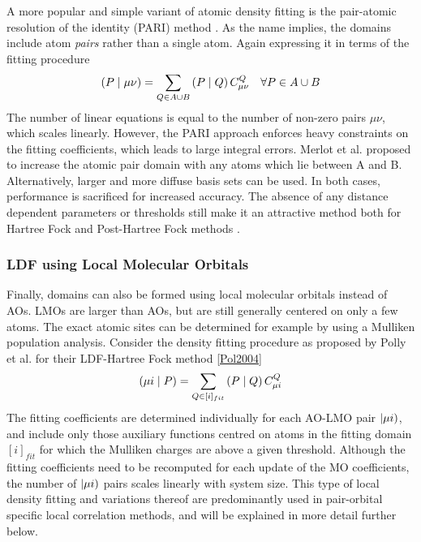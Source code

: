 A more popular and simple variant of atomic density fitting is the pair-atomic resolution of the identity (PARI) method \cite{Mar2013}. As the name implies, the domains include atom \emph{pairs} rather than a single atom. Again expressing it in terms of the fitting procedure
\begin{equation}
\left( P \mid \mu\nu \right) = \sum_{Q \in A \cup B} \left( P \mid Q \right) C^Q_{\mu\nu} \quad \forall P \in A \cup B
\end{equation}
\noindent The number of linear equations is equal to the number of non-zero pairs $\mu\nu$, which scales linearly. However, the PARI approach enforces heavy constraints on the fitting coefficients, which leads to large integral errors. Merlot et al. proposed to increase the atomic pair domain with any atoms which lie between A and B. Alternatively, larger and more diffuse basis sets can be used. In both cases, performance is sacrificed for increased accuracy. The absence of any distance dependent parameters or thresholds still make it an attractive method both for Hartree Fock and Post-Hartree Fock methods \cite{Man2015,For2020}.


\subsubsection{LDF using Local Molecular Orbitals}

Finally, domains can also be formed using local molecular orbitals instead of AOs. LMOs are larger than AOs, but are still generally centered on only a few atoms. The exact atomic sites can be determined for example by using a Mulliken population analysis. Consider the density fitting procedure as proposed by Polly et al. for their LDF-Hartree Fock method \ref{Pol2004}
\begin{equation}
\left( \mu i \mid P \right) = \sum_{Q \in [i]_{fit}} \left( P \mid Q \right) C^Q_{\mu i}
\end{equation}
The fitting coefficients are determined individually for each AO-LMO pair $\left\lvert \mu i \right)$, and include only those auxiliary functions centred on atoms in the fitting domain $[i]_{fit}$ for which the Mulliken charges are above a given threshold. Although the fitting coefficients need to be recomputed for each update of the MO coefficients, the number of $\left\lvert \mu i \right)$ pairs scales linearly with system size. This type of local density fitting and variations thereof are predominantly used in pair-orbital specific local correlation methods, and will be explained in more detail further below. 

